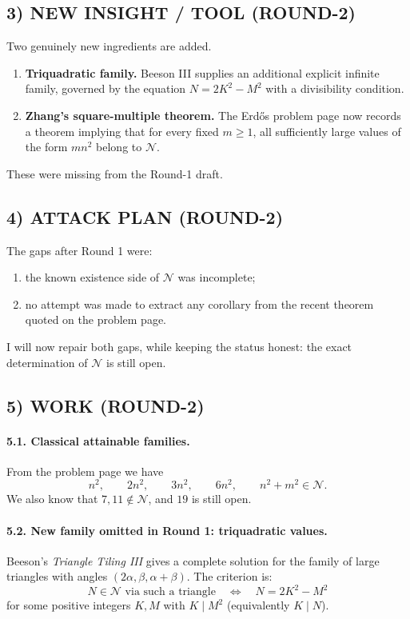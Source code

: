 \subsection*{3) NEW INSIGHT / TOOL (ROUND-2)}
Two genuinely new ingredients are added.
\begin{enumerate}
\item \textbf{Triquadratic family.} Beeson III supplies an additional explicit infinite family, governed by the equation $N=2K^2-M^2$ with a divisibility condition.
\item \textbf{Zhang's square-multiple theorem.} The Erd\H{o}s problem page now records a theorem implying that for every fixed $m\ge 1$, all sufficiently large values of the form $mn^2$ belong to $\mathcal N$.
\end{enumerate}
These were missing from the Round-1 draft.

\subsection*{4) ATTACK PLAN (ROUND-2)}
The gaps after Round 1 were:
\begin{enumerate}
\item the known existence side of $\mathcal N$ was incomplete;
\item no attempt was made to extract any corollary from the recent theorem quoted on the problem page.
\end{enumerate}
I will now repair both gaps, while keeping the status honest: the exact determination of $\mathcal N$ is still open.

\subsection*{5) WORK (ROUND-2)}
\paragraph{5.1. Classical attainable families.}
From the problem page we have
\[
n^2,\qquad 2n^2,\qquad 3n^2,\qquad 6n^2,\qquad n^2+m^2\in \mathcal N.
\]
We also know that $7,11\notin\mathcal N$, and $19$ is still open.

\paragraph{5.2. New family omitted in Round 1: triquadratic values.}
Beeson's \emph{Triangle Tiling III} gives a complete solution for the family of large triangles with angles $(2\alpha,\beta,\alpha+\beta)$. The criterion is:
\[
N\in \mathcal N \text{ via such a triangle}
\quad\Longleftrightarrow\quad
N=2K^2-M^2
\]
for some positive integers $K,M$ with $K\mid M^2$ (equivalently $K\mid N$).


